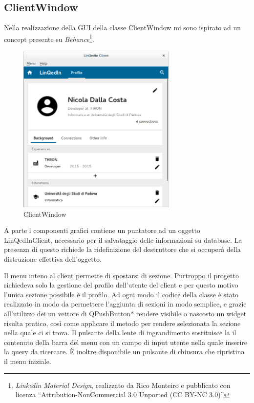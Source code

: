 \documentclass[a4paper]{article}
\begin{document}
\subsection*{ClientWindow}
Nella realizzazione della GUI della classe ClientWindow mi sono ispirato ad un concept presente su \textit{Behance}\footnote{\textit{Linkedin Material Design}, realizzato da Rico Monteiro e pubblicato con licenza ``Attribution-NonCommercial 3.0 Unported (CC BY-NC 3.0)''}.

\begin{figure}[!ht]
\centering
\includegraphics[width=0.7\textwidth]{ClientWindow.png}
\caption{ClientWindow}
\end{figure}

A parte i componenti grafici contiene un puntatore ad un oggetto LinQedInClient, necessario per il salvataggio delle informazioni su database. La presenza di questo richiede la ridefinizione del destruttore che si occuperà della distruzione effettiva dell'oggetto.

Il menu inteno al client permette di spostarsi di sezione. Purtroppo il progetto richiedeva solo la gestione del profilo dell'utente del client e per questo motivo l'unica sezione possibile è il profilo. Ad ogni modo il codice della classe è stato realizzato in modo da permettere l'aggiunta di sezioni in modo semplice, e grazie all'utilizzo dei un vettore di QPushButton* rendere visibile o nascosto un widget risulta pratico, così come applicare il metodo per rendere selezionata la sezione nella quale ci si trova. Il pulsante della lente di ingrandimento sostituisce la il contenuto della barra del menu con un campo di input utente nella quale inserire la query da ricercare. È inoltre disponibile un pulsante di chiusura che ripristina il menu iniziale.
\end{document}
